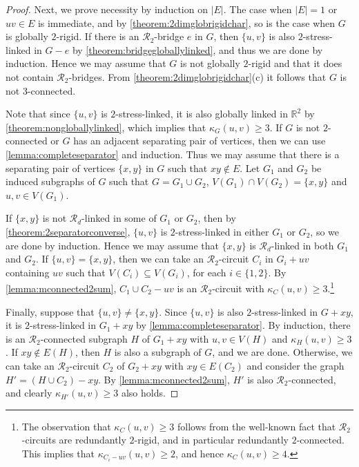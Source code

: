 \documentclass[11pt,a4paper,dvipsnames]{scrartcl}
\theoremstyle{definition}
\newcommand{\RR}{\mathbb{R}}
\newcommand{\globrig}[1]{globally $#1$-rigid}
\newcommand{\rig}[1]{$#1$-rigid}
\newcommand{\strongly}[1]{${#1}$-stress-linked}
\begin{document}
\begin{proof}
    Next, we prove necessity by induction on $|E|$. The case when $|E| = 1$ or $uv \in E$ is immediate, and by \cref{theorem:2dimglobrigidchar}, so is the case when $G$ is \globrig{2}. If there is an $\mathcal{R}_2$-bridge $e$ in $G$, then $\{u,v\}$ is also \strongly{2} in $G-e$ by \cref{theorem:bridgegloballylinked}, and thus we are done by induction. Hence we may assume that $G$ is not \globrig{2} and that it does not contain $\mathcal{R}_2$-bridges. From \cref{theorem:2dimglobrigidchar}(c) it follows that $G$ is not $3$-connected. 
    
    Note that since $\{u,v\}$ is \strongly{2}, it is also globally linked in $\RR^2$ by \cref{theorem:nongloballylinked}, which implies that $\kappa_G(u,v) \geq 3$.
    If $G$ is not $2$-connected or $G$ has an adjacent separating pair of vertices, then we can use \cref{lemma:completeseparator} and induction. Thus we may assume that there is a separating pair of vertices $\{x,y\}$ in $G$ such that $xy \notin E$. Let $G_1$ and $G_2$ be induced subgraphs of $G$ such that $G = G_1 \cup G_2$, $V(G_1) \cap V(G_2) = \{x,y\}$ and $u,v \in V(G_1)$.
    
    If $\{x,y\}$ is not $\mathcal{R}_d$-linked in some of $G_1$ or $G_2$, then by \cref{theorem:2separatorconverse}, $\{u,v\}$ is \strongly{2} in either $G_1$ or $G_2$, so we are done by induction. Hence we may assume that $\{x,y\}$ is $\mathcal{R}_d$-linked in both $G_1$ and $G_2$. If $\{u,v\} = \{x,y\}$, then we can take an $\mathcal{R}_2$-circuit $C_i$ in $G_i+uv$ containing $uv$ such that $V(C_i) \subseteq V(G_i)$, for each $i \in \{1,2\}$. By \cref{lemma:mconnected2sum}, $C_1 \cup C_2 - uv$ is an $\mathcal{R}_2$-circuit with $\kappa_C(u,v) \geq 3$.\footnote{The observation that $\kappa_C(u,v) \geq 3$ follows from the well-known fact that $\mathcal{R}_2$-circuits are redundantly \rig{2}, and in particular redundantly $2$-connected. This implies that $\kappa_{C_i - uv}(u,v) \geq 2$, and hence $\kappa_C(u,v) \geq 4$.}
    
    Finally, suppose that $\{u,v\} \neq \{x,y\}$. Since $\{u,v\}$ is also \strongly{2} in $G+xy$, it is \strongly{2} in $G_1+xy$ by \cref{lemma:completeseparator}. By induction, there is an $\mathcal{R}_2$-connected subgraph $H$ of $G_1 + xy$ with $u,v \in V(H)$ and $\kappa_H(u,v) \geq 3$. If $xy \notin E(H)$, then $H$ is also a subgraph of $G$, and we are done. Otherwise, we can take an $\mathcal{R}_2$-circuit $C_2$ of $G_2+xy$ with $xy \in E(C_2)$ and consider the graph $H' = (H \cup C_2) - xy$. By \cref{lemma:mconnected2sum}, $H'$ is also $\mathcal{R}_2$-connected, and clearly $\kappa_{H'}(u,v) \geq 3$ also holds.
\end{proof}
\end{document}
